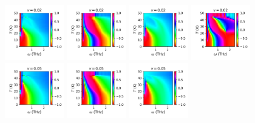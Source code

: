 \documentclass[a4paper]{article}
\begin{document}
\begin{figure}[H]
  \centering
  \includegraphics[width=0.23\textwidth]{v1-g1_phase.png}
  \includegraphics[width=0.23\textwidth]{v1-g2_phase.png}
  \includegraphics[width=0.23\textwidth]{v1-g3_phase.png}
  \includegraphics[width=0.23\textwidth]{v1-g4_phase.png}
  \includegraphics[width=0.23\textwidth]{v2-g1_phase.png}
  \includegraphics[width=0.23\textwidth]{v2-g2_phase.png}
  \includegraphics[width=0.23\textwidth]{v2-g3_phase.png}

\end{figure}
\end{document}
